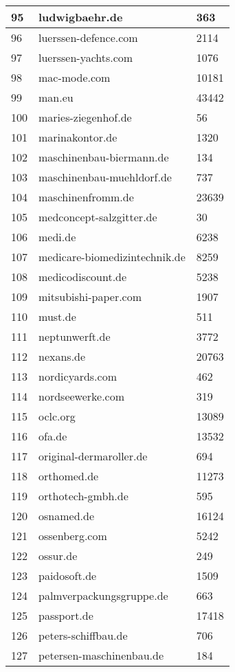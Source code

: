 \begin{longtable}{|m{0.5cm}||m{8cm}|m{5cm}|}
	95 & ludwigbaehr.de & 363\\
	\hline
	96 & luerssen-defence.com & 2114\\
	\hline
	97 & luerssen-yachts.com & 1076\\
	\hline
	98 & mac-mode.com & 10181\\
	\hline
	99 & man.eu & 43442\\
	\hline
	100 & maries-ziegenhof.de & 56\\
	\hline
	101 & marinakontor.de & 1320\\
	\hline
	102 & maschinenbau-biermann.de & 134\\
	\hline
	103 & maschinenbau-muehldorf.de & 737\\
	\hline
	104 & maschinenfromm.de & 23639\\
	\hline
	105 & medconcept-salzgitter.de & 30\\
	\hline
	106 & medi.de & 6238\\
	\hline
	107 & medicare-biomedizintechnik.de & 8259\\
	\hline
	108 & medicodiscount.de & 5238\\
	\hline
	109 & mitsubishi-paper.com & 1907\\
	\hline
	110 & must.de & 511\\
	\hline
	111 & neptunwerft.de & 3772\\
	\hline
	112 & nexans.de & 20763\\
	\hline
	113 & nordicyards.com & 462\\
	\hline
	114 & nordseewerke.com & 319\\
	\hline
	115 & oclc.org & 13089\\
	\hline
	116 & ofa.de & 13532\\
	\hline
	117 & original-dermaroller.de & 694\\
	\hline
	118 & orthomed.de & 11273\\
	\hline
	119 & orthotech-gmbh.de & 595\\
	\hline
	120 & osnamed.de & 16124\\
	\hline
	121 & ossenberg.com & 5242\\
	\hline
	122 & ossur.de & 249\\
	\hline
	123 & paidosoft.de & 1509\\
	\hline
	124 & palmverpackungsgruppe.de & 663\\
	\hline
	125 & passport.de & 17418\\
	\hline
	126 & peters-schiffbau.de & 706\\
	\hline
	127 & petersen-maschinenbau.de & 184\\

\end{longtable}
